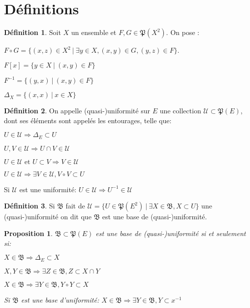\documentclass[a4paper, 11pt, french]{book}
\newenvironment{itemise}{\itemize}{\enditemize}
\theoremstyle{plain} %
\newtheorem{proposition}{Proposition}
\theoremstyle{definition} %
\newtheorem{definition}{Définition}
\theoremstyle{remark} %
\newcommand{\1}{\mathds{1}}
\newcommand{\inv}[1]{#1^{-1}}
\newcommand\et{\text{ et }}
\newcommand\ens[2]{\{#1 \ |\ #2\}}
\begin{document}
\section{Définitions}

\begin{definition}
	Soit $X$ un ensemble et $F, G\in\mathfrak{P}(X^2)$.
	On pose :
	\begin{itemise}
		\item $F\circ G=\ens{(x, z)\in X^2}{\exists y\in X, (x, y)\in G, (y, z)\in F}$.
		\item $F[x]=\ens{y\in X}{(x, y)\in F}$
		\item $\inv{F}=\ens{(y, x)}{(x, y)\in F}$
		\item $\Delta_X=\ens{(x, x)}{x\in X}$
	\end{itemise}
\end{definition}

\begin{definition}
	On appelle (quasi-)uniformité sur $E$ une collection $\mathscr{U}\subset\mathfrak{P}(E)$, dont ses éléments sont appelés les entourages, telle que:
	\begin{itemise}
		\item $U\in\mathscr{U}\Rightarrow\Delta_E\subset U$
		\item $U, V\in\mathscr{U}\Rightarrow U\cap V\in\mathscr{U}$
		\item $U\in\mathscr{U}\et U\subset V\Rightarrow V\in\mathscr{U}$
		\item $U\in\mathscr{U}\Rightarrow\exists V\in\mathscr{U}, V\circ V\subset U$
		\item Si $\mathscr{U}$ est une uniformité: $U\in\mathscr{U}\Rightarrow\inv{U}\in\mathscr{U}$
	\end{itemise}
\end{definition}

\begin{definition}
	Si $\mathfrak{B}$ fait de $\mathscr{U}=\ens{U\in\mathfrak{P}(E^2)}{\exists X\in\mathfrak{B}, X\subset U}$ une (quasi-)uniformité on dit que $\mathfrak{B}$ est une base de (quasi-)uniformité.
\end{definition}

\begin{proposition}
	$\mathfrak{B}\subset\mathfrak{P}(E)$ est une base de (quasi-)uniformité si et seulement si:
	\begin{itemise}
		\item $X\in\mathfrak{B}\Rightarrow\Delta_E\subset X$
		\item $X, Y\in\mathfrak{B}\Rightarrow\exists Z\in\mathfrak{B}, Z\subset X\cap Y$
		\item $X\in\mathfrak{B}\Rightarrow\exists Y\in\mathfrak{B}, Y\circ Y\subset X$
		\item Si $\mathfrak{B}$ est une base d'uniformité: $X\in\mathfrak{B}\Rightarrow\exists Y\in\mathfrak{B}, Y\subset x^{-1}$
	\end{itemise}
\end{proposition}
\end{document}
